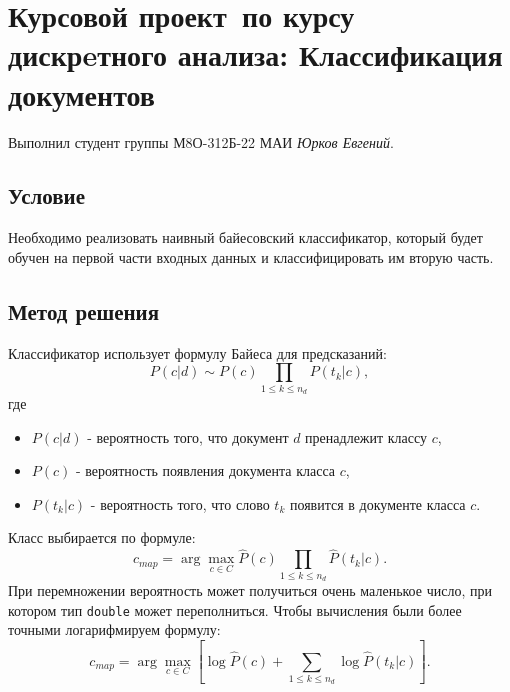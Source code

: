 \documentclass[12pt]{article}
\begin{document}
\section*{Курсовой проект\, по курсу дискрeтного анализа: Классификация документов}

Выполнил студент группы М8О-312Б-22 МАИ \textit{Юрков Евгений}.

\subsection*{Условие}

Необходимо реализовать наивный байесовский классификатор, который будет обучен на первой части входных данных и классифицировать им вторую часть.

\subsection*{Метод решения}

Классификатор использует формулу Байеса для предсказаний:
$$P(c|d) \sim P(c) \prod_{1 \leq k \leq n_d} P(t_k | c),$$
где
\begin{itemize}
    \item $P(c|d)$ - вероятность того, что документ $d$ пренадлежит классу $c$,
    \item $P(c)$ - вероятность появления документа класса $c$,
    \item $P(t_k | c)$ - вероятность того, что слово $t_k$ появится в документе класса $c$.
\end{itemize}

Класс выбирается по формуле:
$$c_{map} = \arg \max_{c \in C} \widehat{P}(c) \prod_{1 \leq k \leq n_d}
\widehat{P}(t_k | c).$$ При перемножении вероятность может получиться очень
маленькое число, при котором тип \texttt{double} может переполниться.
Чтобы вычисления были более точными логарифмируем формулу:
$$c_{map} = \arg \max_{c \in C} [ \log \widehat{P}(c) + \sum_{1 \leq k \leq n_d}
\log \widehat{P}(t_k | c) ].$$
\end{document}
